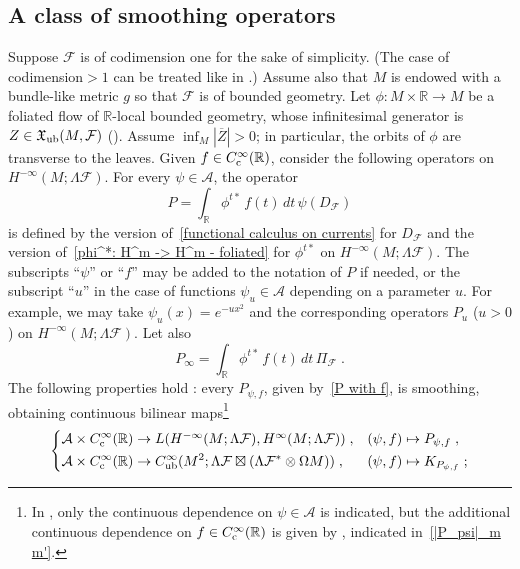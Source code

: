 \documentclass{memo-l}
\theoremstyle{plain}
\theoremstyle{definition}
\theoremstyle{remark}
\newcommand{\R}{\mathbb{R}}
\renewcommand{\AA}{\mathcal{A}}
\newcommand{\FF}{\mathcal{F}}
\newcommand{\fX}{\mathfrak{X}}
\newcommand{\Cinftyub}{C^\infty_{\text{\rm ub}}}
\newcommand{\Cinftyc}{C^\infty_{\text{\rm c}}}
\newcommand{\fXub}{\fX_{\text{\rm ub}}}
\numberwithin{section}{chapter}
\numberwithin{equation}{section}%
\begin{document}
\subsection{A class of smoothing operators}\label{ss: smoothing operators}

Suppose $\FF$ is of codimension one for the sake of simplicity. (The case of codimension${}>1$ can be treated like in \cite{AlvKordy2008a}.) Assume also that $M$ is endowed with a bundle-like metric $g$ so that $\FF$ is of bounded geometry. Let $\phi:M\times\R\to M$ be a foliated flow of $\R$-local bounded geometry, whose infinitesimal generator is $Z\in\fXub(M,\FF)$ (). Assume $\inf_M|\overline Z|>0$; in particular, the orbits of $\phi$ are transverse to the leaves. Given $f\in\Cinftyc(\R)$, consider the following operators on $H^{-\infty}(M;\Lambda\FF)$. For every $\psi\in\AA$, the operator
\begin{equation}\label{P with f}
P=\int_\R\phi^{t*}\,f(t)\,dt\,\psi(D_\FF)
\end{equation}
is defined by the version of~\eqref{functional calculus on currents} for $D_\FF$ and the version of~\eqref{phi^*: H^m -> H^m - foliated} for $\phi^{t*}$ on $H^{-\infty}(M;\Lambda\FF)$. The subscripts ``$\psi$'' or ``$f$'' may be added to the notation of $P$ if needed, or the subscript ``$u$'' in the case of functions $\psi_u\in\AA$ depending on a parameter $u$. For example, we may take $\psi_u(x)=e^{-ux^2}$ and the corresponding operators $P_u$ ($u>0$) on $H^{-\infty}(M;\Lambda\FF)$. Let also
\[
P_\infty=\int_\R\phi^{t*}\,f(t)\,dt\,\Pi_\FF\;.
\]
The following properties hold \cite[Propositions~9.1,~9.4 and~9.6 and Corollaries~9.2,~9.3 and~9.5]{AlvKordyLeichtnam2020}: every $P_{\psi,f}$, given by~\eqref{P with f}, is smoothing, obtaining continuous bilinear maps\footnote{In \cite[Propositions~9.1 and Corollary~9.2]{AlvKordyLeichtnam2020}, only the continuous dependence on $\psi\in\AA$ is indicated, but the additional continuous dependence on $f\in\Cinftyc(\R)$ is given by \cite[Proposition~9.6]{AlvKordyLeichtnam2020}, indicated in~\eqref{|P_psi|_m m'}.}
\begin{equation}\label{P_psi}
\left\{
\begin{alignedat}{2}
\AA\times\Cinftyc(\R)&\to L(\textstyle{H^{-\infty}(M;\Lambda\FF),H^\infty(M;\Lambda\FF)})\;,&\quad(\psi,f)&\mapsto P_{\psi,f}\;,\\
\AA\times\Cinftyc(\R)&\to\Cinftyub(M^2;\Lambda\FF\boxtimes(\Lambda\FF^*\otimes\Omega M))\;,&\quad(\psi,f)&\mapsto K_{P_{\psi,f}}\;;
\end{alignedat}
\right.
\end{equation}
\end{document}
